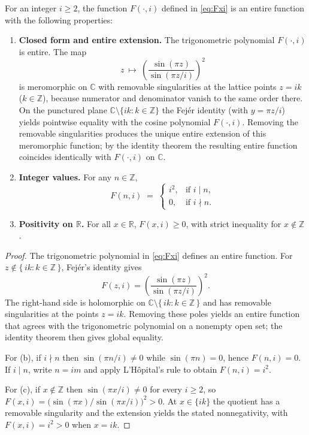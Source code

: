 \begin{proposition}\label{prop:fejer-properties}
For an integer $i \ge 2$, the function $F(\cdot,i)$ defined in \eqref{eq:Fxi} is an entire function with the following properties:
\begin{enumerate}
    \item[(a)] \textbf{Closed form and entire extension.} The trigonometric polynomial $F(\cdot,i)$ is entire. The map
    \[
    z\ \longmapsto\ \left(\frac{\sin(\pi z)}{\sin(\pi z/i)}\right)^{\!2}
    \]
    is meromorphic on $\mathbb{C}$ with removable singularities at the lattice points $z=ik$ ($k\in\mathbb{Z}$), because numerator and denominator vanish to the same order there. On the punctured plane $\mathbb{C}\setminus\{ik:k\in\mathbb{Z}\}$ the Fejér identity (with $y=\pi z/i$) yields pointwise equality with the cosine polynomial $F(\cdot,i)$. Removing the removable singularities produces the unique entire extension of this meromorphic function; by the identity theorem the resulting entire function coincides identically with $F(\cdot,i)$ on $\mathbb{C}$.
    \item[(b)] \textbf{Integer values.} For any $n \in \mathbb{Z}$,
    \[
    F(n,i) \;=\; \begin{cases} i^2, & \text{if } i \mid n, \\ 0, & \text{if } i \nmid n. \end{cases}
    \]
    \item[(c)] \textbf{Positivity on $\mathbb{R}$.} For all $x\in\mathbb{R}$, $F(x,i) \ge 0$, with strict inequality for $x\notin\mathbb{Z}$.
\end{enumerate}
\end{proposition}

\begin{proof}
The trigonometric polynomial in \eqref{eq:Fxi} defines an entire function. For $z \notin \{\,i k: k\in\mathbb{Z}\,\}$, Fejér's identity gives
\[
F(z,i)=\left(\frac{\sin(\pi z)}{\sin(\pi z/i)}\right)^{\!2}.
\]
The right-hand side is holomorphic on $\mathbb{C}\setminus\{\,i k: k\in\mathbb{Z}\,\}$ and has removable singularities at the points $z=i k$. Removing these poles yields an entire function that agrees with the trigonometric polynomial on a nonempty open set; the identity theorem then gives global equality.

For (b), if $i \nmid n$ then $\sin(\pi n/i)\ne 0$ while $\sin(\pi n)=0$, hence $F(n,i)=0$. If $i \mid n$, write $n=i m$ and apply L’Hôpital's rule to obtain $F(n,i)=i^2$.

For (c), if $x\notin\mathbb{Z}$ then $\sin(\pi x/i)\ne 0$ for every $i\ge 2$, so $F(x,i)=\bigl(\sin(\pi x)/\sin(\pi x/i)\bigr)^2>0$. At $x\in\{i k\}$ the quotient has a removable singularity and the extension yields the stated nonnegativity, with $F(x,i)=i^2>0$ when $x=i k$.
\end{proof}

